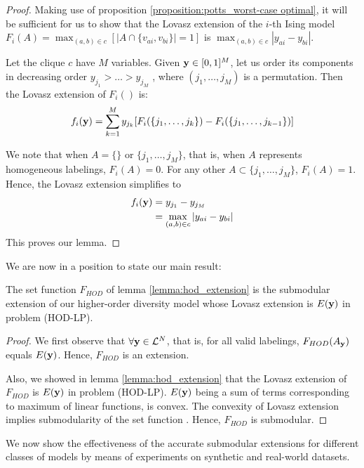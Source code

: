 \begin{proof}
 Making use of proposition \ref{proposition:potts_worst-case optimal}, it will be sufficient for us to show that the Lovasz extension of the $i$-th Ising model $F_i(A) = \max_{(a, b) \in c} [|A \cap \{v_{ai}, v_{bi}\}| = 1]$ is $\max_{(a, b) \in c} |y_{ai} - y_{bi}|$.

Let the clique $c$ have $M$ variables. Given ${\bf y} \in [0, 1]^M$, let us order its components in decreasing order $y_{j_1} > \dots > y_{j_M}$ , where $(j_1,\dots, j_M)$ is a permutation. Then the Lovasz extension of $F_i()$ is:
\begin{equation}
f_i({\bf y}) = \sum_{k = 1}^M y_{j_k} [F_i(\{j_1, \dots, j_k\}) - F_i(\{j_1, \dots, j_{k - 1}\})]
\nonumber
\end{equation}

We note that when $A = \{ \}$ or $\{j_1, \dots, j_M\}$, that is, when $A$ represents homogeneous labelings, $F_i(A) = 0$. For any other $A \subset \{j_1, \dots, j_M\}$, $F_i(A) = 1$. Hence, the Lovasz extension simplifies to
\begin{align}
f_i({\bf y}) &= y_{j_1} - y_{j_M} \nonumber \\
&= \max_{(a, b) \in c} |y_{ai} - y_{bi}| \nonumber
\end{align}
This proves our lemma.
\end{proof}

We are now in a position to state our main result:

{\proposition The set function $F_{HOD}$ of lemma \ref{lemma:hod_extension} is the submodular extension of our higher-order diversity model whose Lovasz extension is $E({\bf y})$ in problem (HOD-LP).} 

\begin{proof}
We first observe that $\forall {\bf y} \in {\mathcal L}^N$, that is, for all valid labelings, $F_{HOD}(A_{\bf y})$ equals $E({\bf y})$.  Hence, $F_{HOD}$ is an extension. 

Also, we showed in lemma \ref{lemma:hod_extension} that the Lovasz extension of
$F_{HOD}$ is $E({\bf y})$ in problem (HOD-LP). $E({\bf y})$ being a sum of terms corresponding to maximum of linear functions, is convex. The convexity of Lovasz extension implies submodularity of the set function \citep{bach2013learning}. Hence, $F_{HOD}$ is submodular. 
\end{proof}
 
We now show the effectiveness of the accurate submodular extensions for different classes of models by means of experiments on synthetic and real-world datasets.

